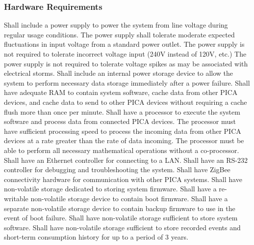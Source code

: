 \subsubsection{Hardware Requirements}
\begin{outline}[enumerate]
\1 Shall include a power supply to power the system from line voltage during regular usage conditions.
\1 The power supply shall tolerate moderate expected fluctuations in input voltage from a standard power outlet.
 \2 The power supply is not required to tolerate incorrect voltage input (240V instead of 120V, etc.)
 \2 The power supply is not required to tolerate voltage spikes as may be associated with electrical storms.
\1 Shall include an internal power storage device to allow the system to perform necessary data storage immediately after a power failure.
\1 Shall have adequate \ac{RAM} to contain system software, cache data from other PICA devices, and cache data to send to other PICA devices without requiring a cache flush more than once per minute.
\1 Shall have a processor to execute the system software and process data from connected PICA devices.
 \2 The processor must have sufficient processing speed to process the incoming data from other PICA devices at a rate greater than the rate of data incoming.
 \2 The processor must be able to perform all necessary mathematical operations without a co-processor.
\1 Shall have an Ethernet controller for connecting to a \ac{LAN}.
\1 Shall have an RS-232 controller for debugging and troubleshooting the system.
\1 Shall have ZigBee connectivity hardware for communication with other PICA systems.
\1 Shall have non-volatile storage dedicated to storing system firmware.
 \2 Shall have a re-writable non-volatile storage device to contain boot firmware.
 \2 Shall have a separate non-volatile storage device to contain backup firmware to use in the event of boot failure.
\1 Shall have non-volatile storage sufficient to store system software.
\1 Shall have non-volatile storage sufficient to store recorded events and short-term consumption history for up to a period of 3 years.
\end{outline}

